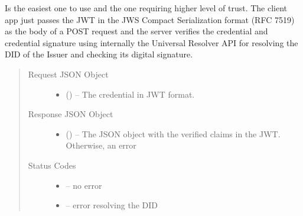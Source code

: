 \documentclass[a4paper,12pt,english,openany]{sphinxmanual}
\begin{document}
\begin{savenotes}\begin{fulllineitems}
\sphinxAtStartPar
Is the easiest one to use and the one requiring higher level of trust. The client app just passes the JWT in the JWS Compact Serialization format (RFC 7519) as the body of a POST request and the server verifies the credential and credential signature using internally the Universal Resolver API for resolving the DID of the Issuer and checking its digital signature.
\begin{quote}\begin{description}
\item[{Request JSON Object}] \leavevmode\begin{itemize}
\item {} 
\sphinxAtStartPar
{} () – The credential in JWT format.

\end{itemize}

\item[{Response JSON Object}] \leavevmode\begin{itemize}
\item {} 
\sphinxAtStartPar
{} () – The JSON object with the verified claims in the JWT. Otherwise, an error

\end{itemize}

\item[{Status Codes}] \leavevmode\begin{itemize}
\item {} 
\sphinxAtStartPar
{}%
\begin{footnote}[10]\sphinxAtStartFootnote
{}
%
\end{footnote} – no error

\item {} 
\sphinxAtStartPar
{}%
\begin{footnote}[11]\sphinxAtStartFootnote
{}
%
\end{footnote} – error resolving the DID

\end{itemize}

\end{description}\end{quote}

\end{fulllineitems}\end{savenotes}
\end{document}
